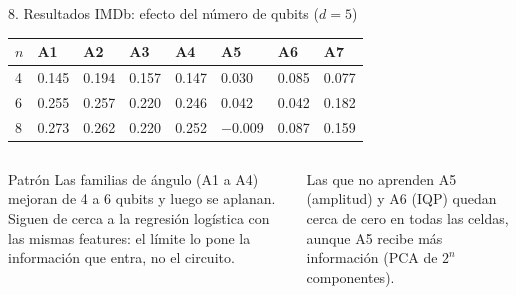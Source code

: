 \documentclass[aspectratio=169,10pt]{beamer}
\begin{document}
\begin{frame}{8. Resultados IMDb: efecto del número de qubits ($d=5$)}
\small
\begin{tabularx}{\textwidth}{@{}lXXXXXXX@{}}
\toprule
$n$ & \textbf{A1} & \textbf{A2} & \textbf{A3} & \textbf{A4} & \textbf{A5} & \textbf{A6} & \textbf{A7}\\
\midrule
4 & 0.145 & 0.194 & 0.157 & 0.147 & 0.030 & 0.085 & 0.077\\
6 & 0.255 & 0.257 & 0.220 & 0.246 & 0.042 & 0.042 & 0.182\\
8 & 0.273 & 0.262 & 0.220 & 0.252 & $-$0.009 & 0.087 & 0.159\\
\bottomrule
\end{tabularx}
\vspace{0.6em}
\begin{columns}[T]
\begin{verdebox}{Patrón}
Las familias de ángulo (A1 a A4) mejoran de 4 a 6 qubits y luego se aplanan. Siguen de cerca a la regresión logística con las mismas features: el límite lo pone la información que entra, no el circuito.
\end{verdebox}
\begin{ambarbox}{Las que no aprenden}
A5 (amplitud) y A6 (IQP) quedan cerca de cero en todas las celdas, aunque A5 recibe más información (PCA de $2^n$ componentes).
\end{ambarbox}
\end{columns}
\end{frame}
\end{document}
